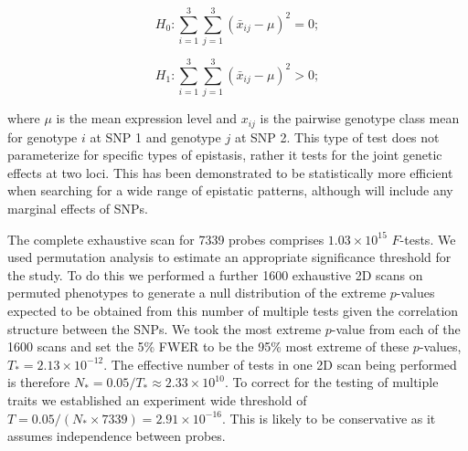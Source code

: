\documentclass{article}
\begin{document}
\begin{equation}
H _0 : \sum _{i=1} ^3 \sum _{j=1} ^3 (\bar x _{ij} - \mu) ^2 = 0; 
\end{equation}

\begin{equation}
H _1 : \sum _{i=1} ^3 \sum _{j=1} ^3 (\bar x _{ij} - \mu) ^2 > 0; 
\label{eq:8df}
\end{equation}

where $\mu$ is the mean expression level and $x _{ij}$ is the pairwise genotype class mean for genotype $i$ at SNP 1 and genotype $j$ at SNP 2. This type of test does not parameterize for specific types of epistasis, rather it tests for the joint genetic effects at two loci. This has been demonstrated to be statistically more efficient when searching for a wide range of epistatic patterns, although will include any marginal effects of SNPs.
 
The complete exhaustive scan for 7339 probes comprises $1.03 \times 10^{15}$ $F$-tests. We used permutation analysis to estimate an appropriate significance threshold for the study. To do this we performed a further 1600 exhaustive 2D scans on permuted phenotypes to generate a null distribution of the extreme $p$-values expected to be obtained from this number of multiple tests given the correlation structure between the SNPs. We took the most extreme $p$-value from each of the 1600 scans and set the 5\% FWER to be the 95\% most extreme of these $p$-values, $T_{*} = 2.13 \times 10^{-12}$. The effective number of tests in one 2D scan being performed is therefore $N_{*} = 0.05 / T_{*} \approx 2.33 \times 10^{10}$. To correct for the testing of multiple traits we established an experiment wide threshold of $T = 0.05 / (N_{*} \times 7339) = 2.91 \times 10^{-16}$. This is likely to be conservative as it assumes independence between probes.
\end{document}
